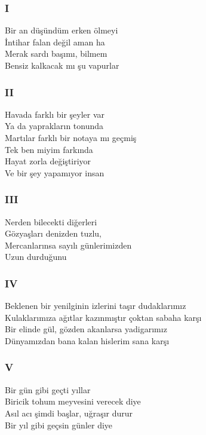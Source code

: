 \subsubsection{I}
Bir an düşündüm erken ölmeyi \\
İntihar falan değil aman ha \\
Merak sardı başımı, bilmem \\
Bensiz kalkacak mı şu vapurlar \\

\subsubsection{II}
Havada farklı bir şeyler var \\
Ya da yaprakların tonunda \\
Martılar farklı bir notaya mı geçmiş \\
Tek ben miyim farkında \\
Hayat zorla değiştiriyor \\
Ve bir şey yapamıyor insan \\

\subsubsection{III}
Nerden bilecekti diğerleri \\
Gözyaşları denizden tuzlu, \\
Mercanlarınsa sayılı günlerimizden \\
Uzun durduğunu \\

\subsubsection{IV}
Beklenen bir yenilginin izlerini taşır dudaklarımız \\
Kulaklarımıza ağıtlar kazınmıştır çoktan sabaha karşı \\
Bir elinde gül, gözden akanlarsa yadigarımız \\
Dünyamızdan bana kalan hislerim sana karşı \\

\subsubsection{V}
Bir gün gibi geçti yıllar \\
Biricik tohum meyvesini verecek diye \\
Asıl acı şimdi başlar, uğraşır durur \\
Bir yıl gibi geçsin günler diye \\

